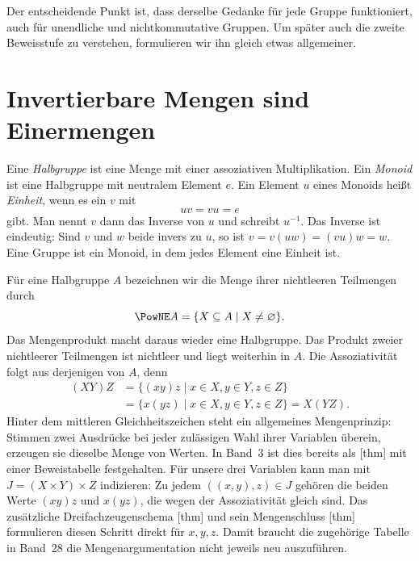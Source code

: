 Der entscheidende Punkt ist, dass derselbe Gedanke für jede
Gruppe funktioniert, auch für unendliche und nichtkommutative
Gruppen. Um später auch die zweite Beweisstufe zu verstehen,
formulieren wir ihn gleich etwas allgemeiner.

\par{}
\section*{Invertierbare Mengen sind Einermengen}
\hypertarget{reconstruction.reading.units}{}

Eine \emph{Halbgruppe} ist eine Menge mit einer
assoziativen Multiplikation. Ein \emph{Monoid} ist eine Halbgruppe
mit neutralem Element \(e\). Ein Element \(u\) eines Monoids heißt
\emph{Einheit}, wenn es ein \(v\) mit
\[
  uv=vu=e
\]
gibt. Man nennt \(v\) dann das Inverse von \(u\) und schreibt
\(u^{-1}\). Das Inverse ist eindeutig: Sind \(v\) und \(w\)
beide invers zu \(u\), so ist
\(v=v(uw)=(vu)w=w\). Eine Gruppe ist ein Monoid, in dem
jedes Element eine Einheit ist.

Für eine Halbgruppe \(A\) bezeichnen wir die Menge ihrer
nichtleeren Teilmengen durch
\[
  \PowNE A=\{X\subseteq A\mid X\neq\varnothing\}.
\]
Das Mengenprodukt macht daraus wieder eine Halbgruppe. Das
Produkt zweier nichtleerer Teilmengen ist nichtleer und liegt
weiterhin in \(A\). Die Assoziativität folgt aus derjenigen von
\(A\), denn
\[
  \begin{aligned}
    (XY)Z&=\{(xy)z\mid x\in X,y\in Y,z\in Z\}\\
         &=\{x(yz)\mid x\in X,y\in Y,z\in Z\}=X(YZ).
  \end{aligned}
\]
Hinter dem mittleren Gleichheitszeichen steht ein allgemeines
Mengenprinzip: Stimmen zwei Ausdrücke bei jeder zulässigen Wahl
ihrer Variablen überein, erzeugen sie dieselbe Menge von Werten.
In Band~3 ist dies bereits als
[thm] mit einer
Beweistabelle festgehalten. Für unsere drei Variablen kann man
mit \(J=(X\times Y)\times Z\) indizieren: Zu jedem
\(((x,y),z)\in J\) gehören die beiden Werte \((xy)z\) und
\(x(yz)\), die wegen der Assoziativität gleich sind.
Das zusätzliche Dreifachzeugenschema
[thm] und
sein Mengenschluss
[thm]
formulieren diesen Schritt direkt für \(x,y,z\).
Damit braucht die zugehörige Tabelle in Band~28 die
Mengenargumentation nicht jeweils neu auszuführen.

